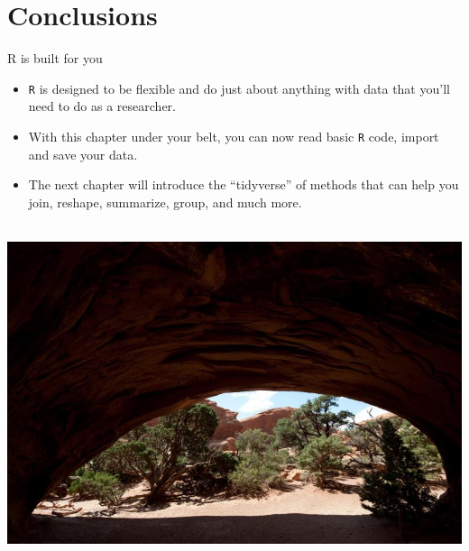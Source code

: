 \documentclass[ignorenonframetext,]{beamer}
\providecommand{\tightlist}{%
\setlength{\itemsep}{0pt}\setlength{\parskip}{0pt}}
\begin{document}
\section{Conclusions}\label{conclusions}

\begin{frame}[fragile]{R is built for you}

\begin{itemize}
\tightlist
\item
  \texttt{R} is designed to be flexible and do just about anything with
  data that you'll need to do as a researcher.
\item
  With this chapter under your belt, you can now read basic \texttt{R}
  code, import and save your data.
\item
  The next chapter will introduce the ``tidyverse'' of methods that can
  help you join, reshape, summarize, group, and much more.
\end{itemize}

\end{frame}

\begin{frame}

\centerline{\includegraphics[height=3.9in]{Figures/Navajo_arch.jpg}}

\end{frame}
\end{document}
